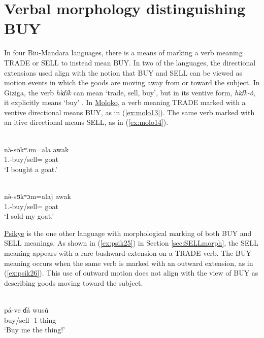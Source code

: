 \section{Verbal morphology distinguishing BUY}	\label{sec:BUYmorph}

In four Biu-Mandara languages, there is a means of marking a verb meaning TRADE or SELL to instead mean BUY. In two of the languages, the directional extensions used align with the notion that BUY and SELL can be viewed as motion events in which the goods are moving away from or toward the subject. In Giziga, the verb \textit{hìɗík} can mean `trade, sell, buy', but in its ventive form, \textit{hìɗk-ò}, it explicitly means `buy' \citep[150]{shayGrammarGizigaChadic2021}. In \hyperref[molo]{Moloko}, a verb meaning TRADE marked with a ventive directional means BUY, as in (\ref{ex:molo13}). The same verb marked with an itive directional means SELL, as in (\ref{ex:molo14}). 

\ea\label{ex:molo13}
 \\
\gll nə̀-sʊkʷɔm=ala awak\\
1.-buy/sell= goat	\\
\glt `I bought a goat.'	

\ex\label{ex:molo14}
 \\
\gll nə̀-sʊkʷɔm=alaj awak\\
1.-buy/sell= goat	\\
\glt `I sold my goat.'
\z

\hyperref[psik]{Psikye} is the one other language with morphological marking of both BUY and SELL meanings. As shown in (\ref{ex:psik25}) in Section \ref{sec:SELLmorph}, the SELL meaning appears with a rare bushward extension on a TRADE verb. The BUY meaning occurs when the same verb is marked with an outward extension, as in (\ref{ex:psik26}). This use of outward motion does not align with the view of BUY as describing goods moving toward the subject. 

\ea\label{ex:psik26}
 \\
\gll  pá-ve ɗá wusú \\
buy/sell- 1 thing	\\
\glt `Buy me the thing!'
\z 

